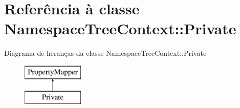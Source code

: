 \hypertarget{class_namespace_tree_context_1_1_private}{\section{Referência à classe Namespace\-Tree\-Context\-:\-:Private}
\label{class_namespace_tree_context_1_1_private}
}
Diagrama de heranças da classe Namespace\-Tree\-Context\-:\-:Private\begin{figure}[H]
\begin{center}
\leavevmode
\includegraphics[height=2.000000cm]{class_namespace_tree_context_1_1_private}
\end{center}
\end{figure}
